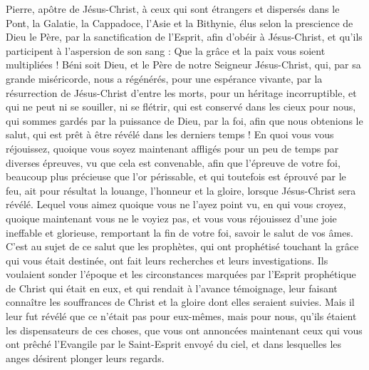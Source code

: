 \begin{multicols}{2}
\VerseOne{}Pierre, apôtre de Jésus-Christ, à ceux qui sont étrangers et dispersés dans le Pont, la Galatie, la Cappadoce, l'Asie et la Bithynie,
élus selon la prescience de Dieu le Père, par la sanctification de l'Esprit, afin d'obéir à Jésus-Christ, et qu'ils participent à l'aspersion de son sang : Que la grâce et la paix vous soient multipliées !
Béni soit Dieu, et le Père de notre Seigneur Jésus-Christ, qui, par sa grande miséricorde, nous a régénérés, pour une espérance vivante, par la résurrection de Jésus-Christ d'entre les morts,
pour un héritage incorruptible, et qui ne peut ni se souiller, ni se flétrir, qui est conservé dans les cieux pour nous,
qui sommes gardés par la puissance de Dieu, par la foi, afin que nous obtenions le salut, qui est prêt à être révélé dans les derniers temps !
En quoi vous vous réjouissez, quoique vous soyez maintenant affligés pour un peu de temps par diverses épreuves, vu que cela est convenable,
afin que l'épreuve de votre foi, beaucoup plus précieuse que l'or périssable, et qui toutefois est éprouvé par le feu, ait pour résultat la louange, l'honneur et la gloire, lorsque Jésus-Christ sera révélé.
Lequel vous aimez quoique vous ne l'ayez point vu, en qui vous croyez, quoique maintenant vous ne le voyiez pas, et vous vous réjouissez d'une joie ineffable et glorieuse,
remportant la fin de votre foi, savoir le salut de vos âmes.
C'est au sujet de ce salut que les prophètes, qui ont prophétisé touchant la grâce qui vous était destinée, ont fait leurs recherches et leurs investigations.
Ils voulaient sonder l'époque et les circonstances marquées par l'Esprit prophétique de Christ qui était en eux, et qui rendait à l'avance témoignage, leur faisant connaître les souffrances de Christ et la gloire dont elles seraient suivies.
Mais il leur fut révélé que ce n'était pas pour eux-mêmes, mais pour nous, qu'ils étaient les dispensateurs de ces choses, que vous ont annoncées maintenant ceux qui vous ont prêché l'Evangile par le Saint-Esprit envoyé du ciel, et dans lesquelles les anges désirent plonger leurs regards.

\end{multicols}
